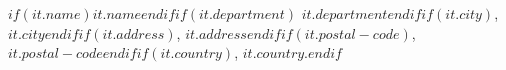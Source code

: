 $if(it.name)$$it.name$$endif$$if(it.department)$ $it.department$$endif$$if(it.city)$, $it.city$$endif$$if(it.address)$, $it.address$$endif$$if(it.postal-code)$, $it.postal-code$$endif$$if(it.country)$, $it.country$.$endif$